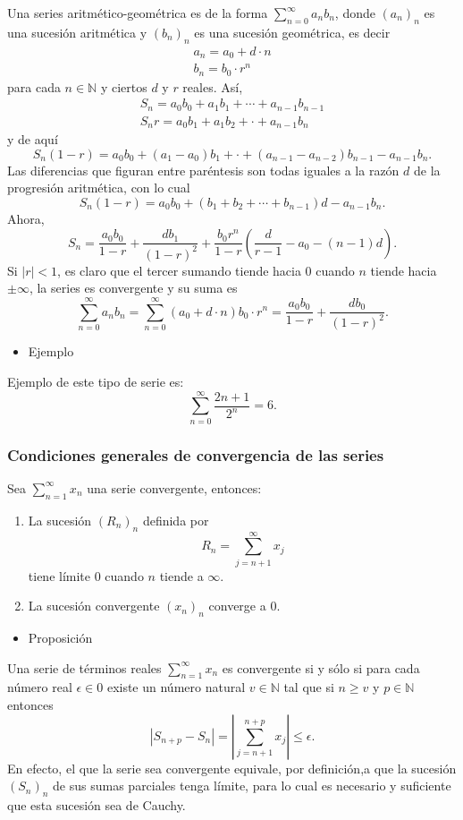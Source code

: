 \documentclass[12pt]{article}
\begin{document}
Una series aritmético-geométrica es de la forma $\sum_{n=0}^{\infty}a_nb_n$, donde $(a_n)_n$ es una sucesión aritmética y $(b_n)_n$ es una sucesión geométrica, es decir \[ \begin{array}{c}
	a_n=a_0+d\cdot n\\
	b_n=b_0\cdot r^n
\end{array} \] para cada $n\in\mathbb{N}$ y ciertos $d$ y $r$ reales. Así, \[ \begin{array}{c}
S_n=a_0b_0+a_1b_1+\cdots+a_{n-1}b_{n-1}\\
S_nr=a_0b_1+a_1b_2+\cdot+a_{n-1}b_n
\end{array} \] y de aquí \[ S_n(1-r)=a_0b_0+(a_1-a_0)b_1+\cdot+(a_{n-1}-a_{n-2})b_{n-1}-a_{n-1}b_n. \]
Las diferencias que figuran entre paréntesis son todas iguales a la razón $d$ de la progresión aritmética, con lo cual \[ S_n(1-r)=a_0b_0+(b_1+b_2+\cdots+b_{n-1})d-a_{n-1}b_n. \]Ahora, \[ S_n=\dfrac{a_0b_0}{1-r}+\dfrac{db_1}{(1-r)^2}+\dfrac{b_0r^n}{1-r}\left(\dfrac{d}{r-1}-a_0-(n-1)d\right). \]
Si $|r|<1$, es claro que el tercer sumando tiende hacia 0 cuando $n$ tiende hacia $\pm\infty$, la series es convergente y su suma es \[ \sum_{n=0}^{\infty}a_nb_n=\sum_{n=0}^{\infty}(a_0+d\cdot n)b_0\cdot r^n=\dfrac{a_0b_0}{1-r}+\dfrac{db_0}{(1-r)^2}. \]
\begin{itemize}[label=\color{red}\textbullet, leftmargin=*]
	\item \color{lightblue}Ejemplo
\end{itemize}
Ejemplo de este tipo de serie es: \[ \sum_{n=0}^{\infty}\dfrac{2n+1}{2^n}=6. \]
\subsubsection{Condiciones generales de convergencia de las series}

Sea $\sum_{n=1}^{\infty}x_n$ una serie convergente, entonces:
\begin{enumerate}[label=\arabic*)]
	\item La sucesión $(R_n)_n$ definida por \[ R_n=\sum_{j=n+1}^{\infty}x_j \] tiene límite 0 cuando $n$ tiende a $\infty$.
	\item La sucesión convergente $(x_n)_n$ converge a 0.
\end{enumerate}
\begin{itemize}[label=\color{red}\textbullet, leftmargin=*]
	\item \color{lightblue}Proposición
\end{itemize}
Una serie de términos reales $\sum_{n=1}^{\infty}x_n$ es convergente si y sólo si para cada número real $\epsilon\in0$ existe un número natural $v\in\mathbb{N}$ tal que si $n\ge v$ y $p\in\mathbb{N}$ entonces \[ |S_{n+p}-S_n|=\left|\sum_{j=n+1}^{n+p}x_j\right| \le\epsilon.\]
En efecto, el que la serie sea convergente equivale, por definición,a que la sucesión $(S_n)_n$ de sus sumas parciales tenga límite, para lo cual es necesario y suficiente que esta sucesión sea de Cauchy.
\end{document}

